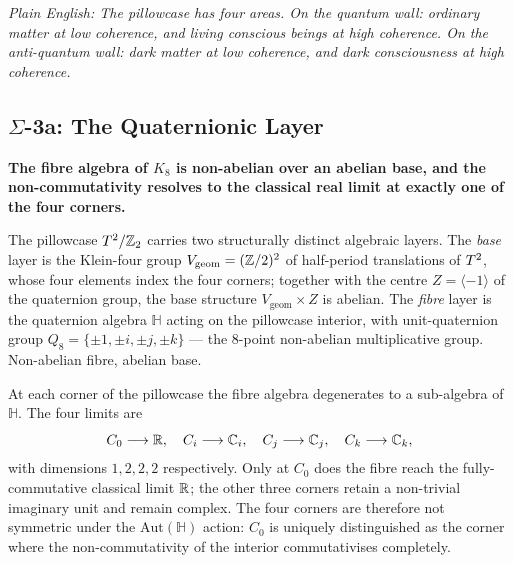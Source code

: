 \emph{Plain English: The pillowcase has four areas.  On the quantum wall: ordinary matter at low coherence, and living conscious beings at high coherence.  On the anti-quantum wall: dark matter at low coherence, and dark consciousness at high coherence.}

\subsection*{$\Sigma$-3a: The Quaternionic Layer}
\par\smallskip
\textbf{The fibre algebra of $K_8$ is non-abelian over an abelian base, and the non-commutativity resolves to the classical real limit at exactly one of the four corners.}

The pillowcase $T^2/\mathbb{Z}_2$ carries two structurally distinct algebraic layers.  The \emph{base} layer is the Klein-four group $V_{\mathrm{geom}} = (\mathbb{Z}/2)^2$ of half-period translations of $T^2$, whose four elements index the four corners; together with the centre $Z = \langle -1 \rangle$ of the quaternion group, the base structure $V_{\mathrm{geom}} \times Z$ is abelian.  The \emph{fibre} layer is the quaternion algebra $\mathbb{H}$ acting on the pillowcase interior, with unit-quaternion group $Q_8 = \{\pm 1, \pm i, \pm j, \pm k\}$ --- the 8-point non-abelian multiplicative group.  Non-abelian fibre, abelian base.

At each corner of the pillowcase the fibre algebra degenerates to a sub-algebra of $\mathbb{H}$.  The four limits are
\[
  C_0 \longrightarrow \mathbb{R}, \quad
  C_i \longrightarrow \mathbb{C}_i, \quad
  C_j \longrightarrow \mathbb{C}_j, \quad
  C_k \longrightarrow \mathbb{C}_k,
\]
with dimensions $1, 2, 2, 2$ respectively.  Only at $C_0$ does the fibre reach the fully-commutative classical limit $\mathbb{R}$; the other three corners retain a non-trivial imaginary unit and remain complex.  The four corners are therefore not symmetric under the $\mathrm{Aut}(\mathbb{H})$ action: $C_0$ is uniquely distinguished as the corner where the non-commutativity of the interior commutativises completely.

